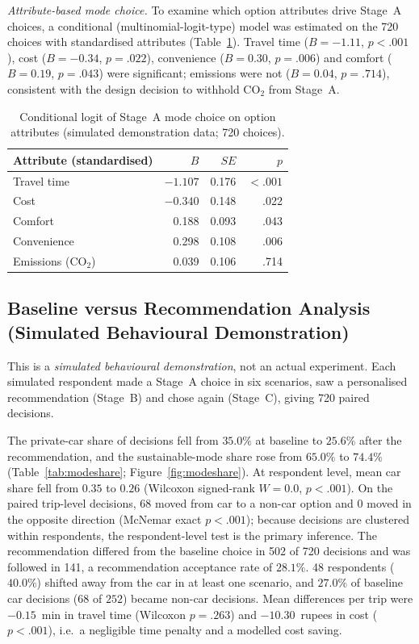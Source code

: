 \documentclass[11pt,a4paper]{article}
\begin{document}
\textit{Attribute-based mode choice.} To examine which option attributes drive Stage~A choices, a
conditional (multinomial-logit-type) model was estimated on the 720 choices with standardised
attributes (Table~\ref{tab:condlogit}). Travel time ($B=-1.11$, $p<.001$), cost ($B=-0.34$,
$p=.022$), convenience ($B=0.30$, $p=.006$) and comfort ($B=0.19$, $p=.043$) were significant;
emissions were not ($B=0.04$, $p=.714$), consistent with the design decision to withhold CO$_2$ from
Stage~A.

\begin{table}[H]
\centering
\small
\caption{Conditional logit of Stage~A mode choice on option attributes (simulated demonstration data;
720 choices).}
\label{tab:condlogit}
\begin{tabular}{@{}lrrr@{}}
\toprule
\textbf{Attribute (standardised)} & \textbf{$B$} & \textbf{$SE$} & \textbf{$p$}\\
\midrule
Travel time & $-1.107$ & 0.176 & $<.001$\\
Cost & $-0.340$ & 0.148 & .022\\
Comfort & 0.188 & 0.093 & .043\\
Convenience & 0.298 & 0.108 & .006\\
Emissions (CO$_2$) & 0.039 & 0.106 & .714\\
\bottomrule
\end{tabular}
\end{table}

\subsection{Baseline versus Recommendation Analysis (Simulated Behavioural Demonstration)}
This is a \emph{simulated behavioural demonstration}, not an actual experiment. Each simulated
respondent made a Stage~A choice in six scenarios, saw a personalised recommendation (Stage~B) and
chose again (Stage~C), giving 720 paired decisions.

The private-car share of decisions fell from $35.0\%$ at baseline to $25.6\%$ after the
recommendation, and the sustainable-mode share rose from $65.0\%$ to $74.4\%$
(Table~\ref{tab:modeshare}; Figure~\ref{fig:modeshare}). At respondent level, mean car share fell
from $0.35$ to $0.26$ (Wilcoxon signed-rank $W = 0.0$, $p < .001$). On the paired trip-level
decisions, 68 moved from car to a non-car option and 0 moved in the opposite direction (McNemar exact
$p < .001$); because decisions are clustered within respondents, the respondent-level test is the
primary inference. The recommendation differed from the baseline choice in 502 of 720 decisions and
was followed in 141, a recommendation acceptance rate of $28.1\%$. 48 respondents ($40.0\%$) shifted
away from the car in at least one scenario, and $27.0\%$ of baseline car decisions ($68$ of $252$)
became non-car decisions. Mean differences per trip were $-0.15$~min in travel time (Wilcoxon
$p = .263$) and $-10.30$~rupees in cost ($p < .001$), i.e.\ a negligible time penalty and a modelled
cost saving.
\end{document}
